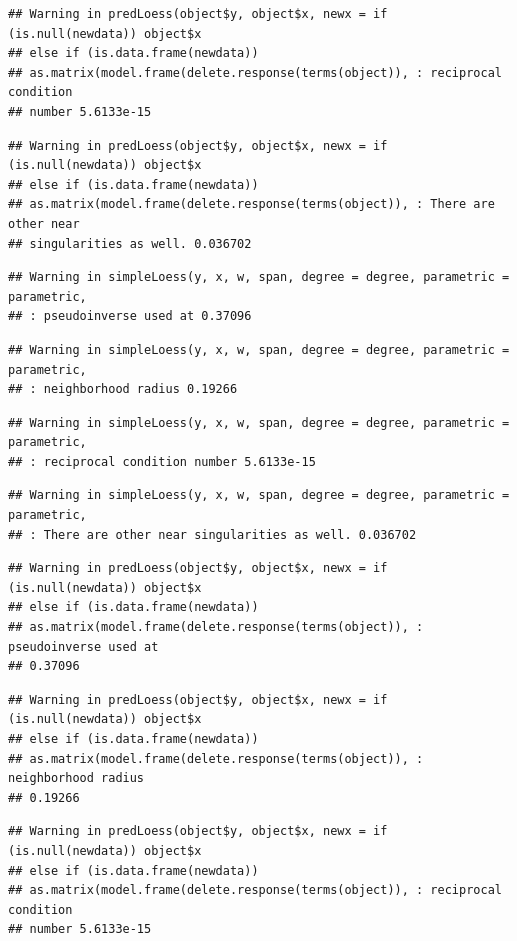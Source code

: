 \documentclass[
  bookmarksnumbered]{article}
\begin{document}
\begin{verbatim}
## Warning in predLoess(object$y, object$x, newx = if (is.null(newdata)) object$x
## else if (is.data.frame(newdata))
## as.matrix(model.frame(delete.response(terms(object)), : reciprocal condition
## number 5.6133e-15
\end{verbatim}

\begin{verbatim}
## Warning in predLoess(object$y, object$x, newx = if (is.null(newdata)) object$x
## else if (is.data.frame(newdata))
## as.matrix(model.frame(delete.response(terms(object)), : There are other near
## singularities as well. 0.036702
\end{verbatim}

\begin{verbatim}
## Warning in simpleLoess(y, x, w, span, degree = degree, parametric = parametric,
## : pseudoinverse used at 0.37096
\end{verbatim}

\begin{verbatim}
## Warning in simpleLoess(y, x, w, span, degree = degree, parametric = parametric,
## : neighborhood radius 0.19266
\end{verbatim}

\begin{verbatim}
## Warning in simpleLoess(y, x, w, span, degree = degree, parametric = parametric,
## : reciprocal condition number 5.6133e-15
\end{verbatim}

\begin{verbatim}
## Warning in simpleLoess(y, x, w, span, degree = degree, parametric = parametric,
## : There are other near singularities as well. 0.036702
\end{verbatim}

\begin{verbatim}
## Warning in predLoess(object$y, object$x, newx = if (is.null(newdata)) object$x
## else if (is.data.frame(newdata))
## as.matrix(model.frame(delete.response(terms(object)), : pseudoinverse used at
## 0.37096
\end{verbatim}

\begin{verbatim}
## Warning in predLoess(object$y, object$x, newx = if (is.null(newdata)) object$x
## else if (is.data.frame(newdata))
## as.matrix(model.frame(delete.response(terms(object)), : neighborhood radius
## 0.19266
\end{verbatim}

\begin{verbatim}
## Warning in predLoess(object$y, object$x, newx = if (is.null(newdata)) object$x
## else if (is.data.frame(newdata))
## as.matrix(model.frame(delete.response(terms(object)), : reciprocal condition
## number 5.6133e-15
\end{verbatim}
\end{document}
